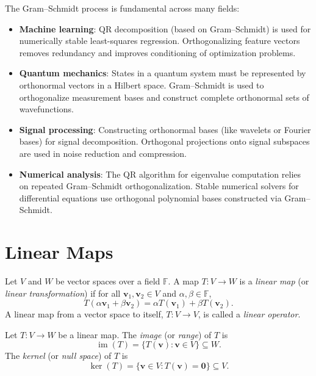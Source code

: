 \begin{remark}
  The Gram--Schmidt process is fundamental across many fields:
  \begin{itemize}
    \item \textbf{Machine learning}: QR decomposition (based on Gram--Schmidt) is used for numerically stable least-squares regression. Orthogonalizing feature vectors removes redundancy and improves conditioning of optimization problems.

    \item \textbf{Quantum mechanics}: States in a quantum system must be represented by orthonormal vectors in a Hilbert space. Gram--Schmidt is used to orthogonalize measurement bases and construct complete orthonormal sets of wavefunctions.

    \item \textbf{Signal processing}: Constructing orthonormal bases (like wavelets or Fourier bases) for signal decomposition. Orthogonal projections onto signal subspaces are used in noise reduction and compression.

    \item \textbf{Numerical analysis}: The QR algorithm for eigenvalue computation relies on repeated Gram--Schmidt orthogonalization. Stable numerical solvers for differential equations use orthogonal polynomial bases constructed via Gram--Schmidt.
  \end{itemize}
\end{remark}

\section{Linear Maps}

\begin{definition}
  Let $V$ and $W$ be vector spaces over a field $\mathbb{F}$.
  A map $T : V \to W$ is a \emph{linear map} (or \emph{linear transformation}) if for all $\mathbf{v}_1, \mathbf{v}_2 \in V$ and $\alpha, \beta \in \mathbb{F}$,
  \begin{equation}
    T(\alpha\mathbf{v}_1 + \beta\mathbf{v}_2) = \alpha T(\mathbf{v}_1) + \beta T(\mathbf{v}_2).
  \end{equation}
  A linear map from a vector space to itself, $T : V \to V$, is called a \emph{linear operator}.
\end{definition}

\begin{definition}
  Let $T : V \to W$ be a linear map. The \emph{image} (or \emph{range}) of $T$ is
  \begin{equation}
    \operatorname{im}(T) = \{T(\mathbf{v}) : \mathbf{v} \in V\} \subseteq W.
  \end{equation}
  The \emph{kernel} (or \emph{null space}) of $T$ is
  \begin{equation}
    \ker(T) = \{\mathbf{v} \in V : T(\mathbf{v}) = \mathbf{0}\} \subseteq V.
  \end{equation}
\end{definition}

